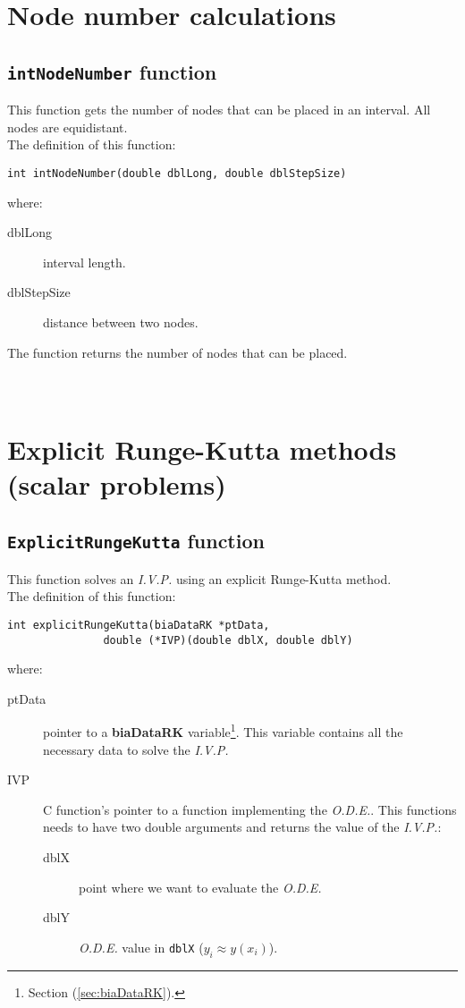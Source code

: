 \section{Node number calculations}

\subsection{\texttt{intNodeNumber} function}

This function gets the number of nodes that can be placed in an interval. All nodes are equidistant.\\

The definition of this function:
%
\begin{verbatim}
int intNodeNumber(double dblLong, double dblStepSize)
\end{verbatim}
%
where:
%
\begin{description}
\item[dblLong] interval length.
\item[dblStepSize] distance between two nodes.
\end{description}

The function returns the number of nodes that can be placed.\\ \\
%
\ \\

\section{Explicit Runge-Kutta methods (scalar problems)}

\subsection{\texttt{ExplicitRungeKutta} function}

This function solves an \emph{I.V.P.} using an explicit Runge-Kutta method.\\

The definition of this function:
%
\begin{verbatim}
int explicitRungeKutta(biaDataRK *ptData, 
               double (*IVP)(double dblX, double dblY)
\end{verbatim} 
%
where:
%
\begin{description}
\item[ptData] pointer to a \textbf{biaDataRK} variable\footnote{Section (\ref{sec:biaDataRK}).}. This variable contains all the necessary data to solve the \emph{I.V.P.}
\item[IVP] C function's pointer to a function implementing the \emph{O.D.E.}. This functions needs to have two double arguments and returns the value of the \emph{I.V.P.}:
\begin{description}
	\item[dblX] point where we want to evaluate the \emph{O.D.E.}
	\item[dblY] \emph{O.D.E.} value in \texttt{dblX} ($y_i \approx y(x_i)$).
\end{description}
\end{description}

